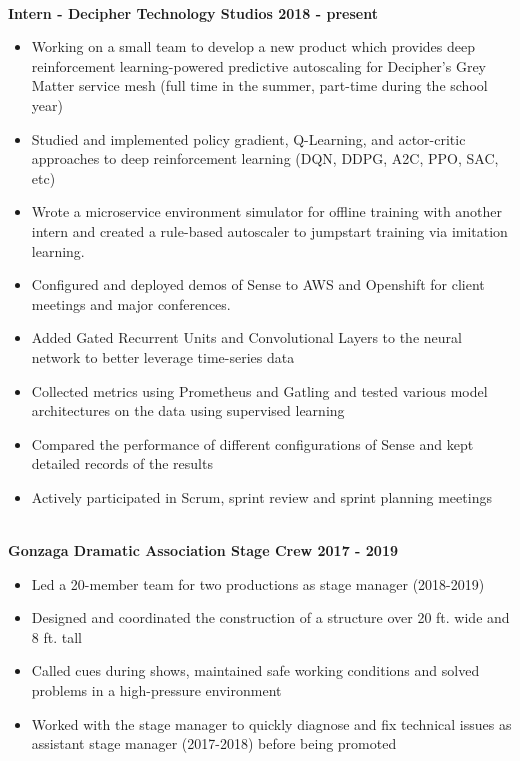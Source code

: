 \documentclass{article}
\begin{document}
\begin{center}
\begin{flushleft}
    {\large\textbf{\underline{}}} \\
    \textbf{Intern - Decipher Technology Studios \hfill 2018 - present}
    \begin{itemize}
      \item Working on a small team to develop a new product which provides deep reinforcement learning-powered predictive autoscaling for Decipher’s Grey Matter service mesh (full time in the summer, part-time during the school year)
      \item Studied and implemented policy gradient, Q-Learning, and actor-critic approaches to deep reinforcement learning (DQN, DDPG, A2C, PPO, SAC, etc)
      \item Wrote a microservice environment simulator for offline training with another intern and created a rule-based autoscaler to jumpstart training via imitation learning.
      \item Configured and deployed demos of Sense to AWS and Openshift for client meetings and major conferences.
      \item Added Gated Recurrent Units and Convolutional Layers to the neural network to better leverage time-series data
      \item Collected metrics using Prometheus and Gatling and tested various model architectures on the data using supervised learning
      \item Compared the performance of different configurations of Sense and kept detailed records of the results
      \item Actively participated in Scrum, sprint review and sprint planning meetings
    \end{itemize}


    {\large\textbf{\underline{}}} \\
    \textbf{Gonzaga Dramatic Association Stage Crew \hfill 2017 - 2019}
    \begin{itemize}
      \item Led a 20-member team for two productions as stage manager (2018-2019)
      \item Designed and coordinated the construction of a structure over 20 ft. wide and 8 ft. tall
      \item Called cues during shows, maintained safe working conditions and solved problems in a high-pressure environment
      \item Worked with the stage manager to quickly diagnose and fix technical issues as assistant stage manager (2017-2018) before being promoted
    \end{itemize}


\end{flushleft}
\end{center}
\end{document}
